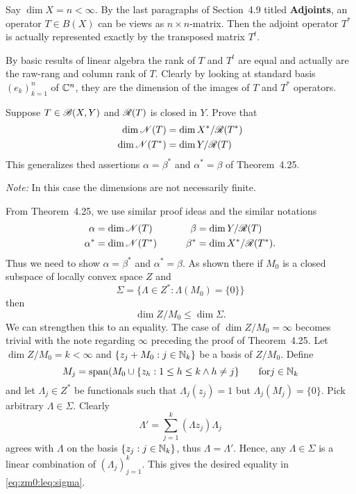 \begin{enumerate}
Say \(\dim X = n < \infty\).
By the last paragraphs of Section~4.9 titled \textbf{Adjoints},
an operator \(T\in B(X)\) can be views as \(n\times n\)-matrix.
Then the adjoint operator \(T^*\) is actually represented exactly
by the transposed matrix \(T^t\).

By basic results of linear algebra the rank of $T$ and \(T^t\) 
are equal and actually are the raw-rang and column rank of $T$.
Clearly by looking at standard basis \((e_k)_{k=1}^n\) of \(\mathbb{C}^n\),
they are the dimension of the images of $T$ and \(T^*\) operators.


\begin{excopy}
Suppose \(T \in \mathscr{B}(X,Y)\) and \(\mathscr{R}(T)\) is closed in $Y$. Prove that
\begin{align*}
\dim \mathscr{N}(T) &= \dim X^*/\mathscr{R}(T^*) \\
\dim \mathscr{N}(T^*) &= \dim Y/\mathscr{R}(T)
\end{align*}
This generalizes thed assertions \(\alpha = \beta^*\) and \(\alpha^* = \beta\)
 of Theorem~4.25.
\end{excopy}

\emph{Note:} In this case the dimensions are not necessarily finite.

From Theorem~4.25, 
we use similar proof ideas and the similar notations
\begin{alignat*}{2}
\alpha &= \dim \mathscr{N}(T)   \qquad &   \beta &= \dim Y / \mathscr{R}(T) \\
\alpha^* &= \dim \mathscr{N}(T^*) \qquad & \beta^* &= \dim X^* / \mathscr{R}(T^*).
\end{alignat*}
Thus we need to show \(\alpha = \beta^*\) and \(\alpha^* = \beta\).
As shown there if \(M_0\) is a closed subspace of locally convex space $Z$ and
\begin{equation*}
\Sigma = \bigl\{\Lambda \in Z^*: \Lambda(M_0) = \{0\}\bigr\}
\end{equation*}
then 
\begin{equation}  \label{eq:zm0:leq:sigma}
 \dim Z/M_0 \leq \dim \Sigma.
\end{equation}
We can strengthen this to  an equality.
The case of \(\dim Z/M_0 = \infty\)
becomes trivial with the note regarding \(\infty\)
preceding the proof of Theorem~4.25.
Let \(\dim Z/M_0 = k < \infty\) and 
\(\{z_j+M_0:j \in\mathbb{N}_k\}\) be a basis of \(Z/M_0\).
Define 
\begin{equation*}
M_j = \mathop{\rm span}\nolimits(M_0 \cup \{z_h: 1\leq h \leq k \wedge h \neq j\}
\qquad \textnormal{for} j\in\mathbb{N}_k
\end{equation*}
and let \(\Lambda_j \in Z^*\) be functionals such that 
\(\Lambda_j(z_j)=1\) but \(\Lambda_j(M_j) = \{0\}\).
Pick arbitrary \(\Lambda \in \Sigma\).
Clearly
\begin{equation*}
\Lambda' = \sum_{j=1}^k (\Lambda z_j)\Lambda_j
\end{equation*}
agrees with \(\Lambda\) on the basis \(\{z_j: j\in\mathbb{N}_k\}\),
thus \(\Lambda = \Lambda'\).
Hence, any \(\Lambda \in \Sigma\) 
is a linear combination of \((\Lambda_j)_{j=1}^k\).
This gives the desired equality in \eqref{eq:zm0:leq:sigma}.



\end{enumerate}
